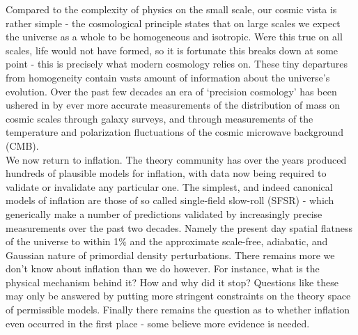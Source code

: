 \documentclass[a4paper,10pt]{article}
\begin{document}
Compared to the complexity of physics on the small scale, our cosmic vista is rather simple - the cosmological principle states that on large scales we expect the universe as a whole to be homogeneous and isotropic. Were this true on all scales, life would not have formed, so it is fortunate this breaks down at some point - this is precisely what modern cosmology relies on. These tiny departures from homogeneity contain vasts amount of information about the universe's evolution. Over the past few decades an era of `precision cosmology' has been ushered in by ever more accurate measurements of the distribution of mass on cosmic scales through galaxy surveys, and through measurements of the temperature and polarization fluctuations of the cosmic microwave background (CMB). \\

We now return to inflation. The theory community has over the years produced hundreds of plausible models for inflation, with data now being required to validate or invalidate any particular one. The simplest, and indeed canonical models of inflation are those of so called single-field slow-roll (SFSR) - which generically make a number of predictions validated by increasingly precise measurements over the past two decades. Namely the present day spatial flatness of the universe to within 1\% and the approximate scale-free, adiabatic, and Gaussian nature of primordial density perturbations. There remains more we don't know about inflation than we do however. For instance, what is the physical mechanism behind it? How and why did it stop? Questions like these may only be answered by putting more stringent constraints on the theory space of permissible models. Finally there remains the question as to whether inflation even occurred in the first place - some believe more evidence is needed.\\
\end{document}
